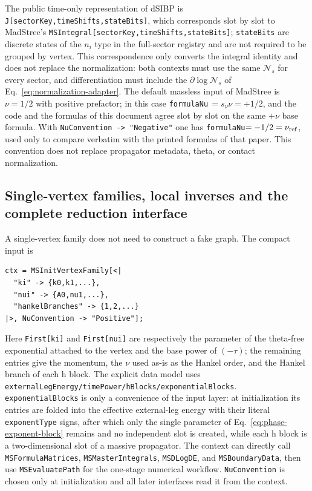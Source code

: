 \documentclass[11pt,a4paper]{article}
\newcommand{\cN}{\mathcal N}
\begin{document}
The public time-only representation of dSIBP is \texttt{J[sectorKey,timeShifts,stateBits]}, which corresponds slot by slot to MadStree's \texttt{MSIntegral[sectorKey,timeShifts,stateBits]}; \texttt{stateBits} are discrete states of the $n_i$ type in the full-sector registry and are not required to be grouped by vertex. This correspondence only converts the integral identity and does not replace the normalization: both contexts must use the same $\cN_s$ for every sector, and differentiation must include the $\partial\log\cN_s$ of Eq.~\eqref{eq:normalization-adapter}. The default massless input of MadStree is $\nu=1/2$ with positive prefactor; in this case \texttt{formulaNu}$\,=s_\nu\nu=+1/2$, and the code and the formulas of this document agree slot by slot on the same $+\nu$ base formula. With \texttt{NuConvention -> "Negative"} one has \texttt{formulaNu}$=-1/2=\nu_{\rm ref}$, used only to compare verbatim with the printed formulas of that paper. This convention does not replace propagator metadata, theta, or contact normalization.

\subsection{Single-vertex families, local inverses and the complete reduction interface}
\label{sec:reduction-interface}

A single-vertex family does not need to construct a fake graph. The compact input is
\begin{verbatim}
ctx = MSInitVertexFamily[<|
  "ki" -> {k0,k1,...},
  "nui" -> {A0,nu1,...},
  "hankelBranches" -> {1,2,...}
|>, NuConvention -> "Positive"];
\end{verbatim}
Here \texttt{First[ki]} and \texttt{First[nui]} are respectively the parameter of the
theta-free exponential attached to the vertex and the base power of $(-\tau)$; the remaining entries give the momentum,
the $\nu$ used as-is as the Hankel order, and the Hankel branch of each h block. The explicit data model uses
\texttt{externalLegEnergy/timePower/hBlocks/exponentialBlocks}. \texttt{exponentialBlocks} is only a
convenience of the input layer: at initialization its entries are folded into the effective
external-leg energy with their literal \texttt{exponentType} signs, after which only the single
parameter of Eq.~\eqref{eq:phase-exponent-block} remains and no independent slot is created, while
each h block is a two-dimensional slot of a massive propagator. The context can directly call
\texttt{MSFormulaMatrices}, \texttt{MSMasterIntegrals}, \texttt{MSDLogDE}, and
\texttt{MSBoundaryData}, then use \texttt{MSEvaluatePath} for the one-stage numerical workflow.
\texttt{NuConvention} is chosen only at initialization and all later interfaces read it
from the context.
\end{document}
